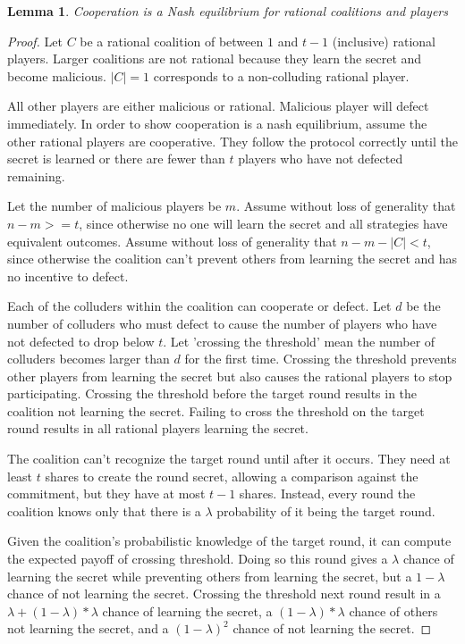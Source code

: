 \documentclass{dalcsthesis}
\newtheorem{lemma}{Lemma}
\begin{document}
\begin{lemma} Cooperation is a Nash equilibrium for rational coalitions and players \end{lemma}
\begin{proof}
Let $C$ be a rational coalition of between $1$ and $t-1$ (inclusive) rational players. Larger coalitions are not rational because they learn the secret and become malicious. $|C| = 1$ corresponds to a non-colluding rational player.

All other players are either malicious or rational. Malicious player will defect immediately. In order to show cooperation is a nash equilibrium, assume the other rational players are cooperative. They follow the protocol correctly until the secret is learned or there are fewer than $t$ players who have not defected remaining.

Let the number of malicious players be $m$. Assume without loss of generality that $n - m >= t$, since otherwise no one will learn the secret and all strategies have equivalent outcomes. Assume without loss of generality that $n - m - |C| < t$, since otherwise the coalition can't prevent others from learning the secret and has no incentive to defect.

Each of the colluders within the coalition can cooperate or defect. Let $d$ be the number of colluders who must defect to cause the number of players who have not defected to drop below $t$. Let 'crossing the threshold' mean the number of colluders becomes larger than $d$ for the first time. Crossing the threshold prevents other players from learning the secret but also causes the rational players to stop participating. Crossing the threshold before the target round results in the coalition not learning the secret. Failing to cross the threshold on the target round results in all rational players learning the secret.

The coalition can't recognize the target round until after it occurs. They need at least $t$ shares to create the round secret, allowing a comparison against the commitment, but they have at most $t-1$ shares. Instead, every round the coalition knows only that there is a $\lambda$ probability of it being the target round.

Given the coalition's probabilistic knowledge of the target round, it can compute the expected payoff of crossing threshold. Doing so this round gives a $\lambda$ chance of learning the secret while preventing others from learning the secret, but a $1-\lambda$ chance of not learning the secret. Crossing the threshold next round result in a $\lambda + (1-\lambda)*\lambda$ chance of learning the secret, a $(1-\lambda)*\lambda$ chance of others not learning the secret, and a $(1-\lambda)^2$ chance of not learning the secret.


\end{proof}
\end{document}
